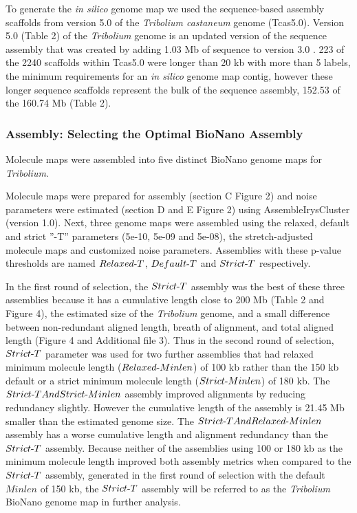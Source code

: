 \documentclass{bmcart}
\begin{document}
To generate the \textit{in silico} genome map we used the sequence-based assembly scaffolds from version 5.0 of the \textit{Tribolium castaneum} genome (Tcas5.0). Version 5.0 (Table 2) of the \textit{Tribolium} genome is an updated version of the sequence assembly that was created by adding 1.03 Mb of sequence to version 3.0 \cite{Beetle2008}. 223 of the 2240 scaffolds within Tcas5.0 were longer than 20 kb with more than 5 labels, the minimum requirements for an \textit{in silico} genome map contig, however these longer sequence scaffolds represent the bulk of the sequence assembly, 152.53 of the 160.74 Mb (Table 2).


\subsubsection*{Assembly: Selecting the Optimal BioNano Assembly}
Molecule maps were assembled into five distinct BioNano genome maps for \textit{Tribolium}. 

Molecule maps were prepared for assembly (section C Figure 2) and noise parameters were estimated (section D and E Figure 2) using AssembleIrysCluster (version 1.0). Next, three genome maps were assembled using the relaxed, default and strict ”-T” parameters (5e-10, 5e-09 and 5e-08), the stretch-adjusted molecule maps and customized noise parameters. Assemblies with these p-value thresholds are named $Relaxed\textnormal{-}T$, $Default\textnormal{-}T$ and $Strict\textnormal{-}T$ respectively. 

In the first round of selection, the $Strict\textnormal{-}T$ assembly was the best of these three assemblies because it has a cumulative length close to 200 Mb (Table 2 and Figure 4), the estimated size of the \textit{Tribolium} genome, and a small difference between non-redundant aligned length, breath of alignment, and total aligned length (Figure 4 and Additional file 3). Thus in the second round of selection,   $Strict\textnormal{-}T$ parameter was used for two further assemblies that had relaxed minimum molecule length ($Relaxed\textnormal{-}Minlen$) of 100 kb rather than the 150 kb default or a strict minimum molecule length ($Strict\textnormal{-}Minlen$) of 180 kb. The $Strict\textnormal{-}TAndStrict\textnormal{-}Minlen$ assembly improved alignments by reducing redundancy slightly. However the cumulative length of the assembly is 21.45 Mb smaller than the estimated genome size. The $Strict\textnormal{-}TAndRelaxed\textnormal{-}Minlen$ assembly has a worse cumulative length and alignment redundancy than the $Strict\textnormal{-}T$ assembly. Because neither of the assemblies using 100 or 180 kb as the minimum molecule length improved both assembly metrics when compared to the $Strict\textnormal{-}T$ assembly, generated in the first round of selection with the default $Minlen$ of 150 kb, the $Strict\textnormal{-}T$ assembly will be referred to as the \textit{Tribolium} BioNano genome map in further analysis.
\end{document}
